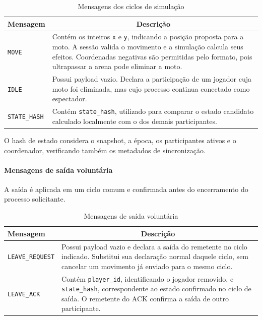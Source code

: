 \documentclass[11pt,a4paper]{article}
\begin{document}
\begin{table}[H]
    \centering
    \caption{Mensagens dos ciclos de simulação}
    \label{tab:simulacao_p2p}
    \begin{tabular}{|p{3.5cm}|p{10cm}|}
        \hline
        \textbf{Mensagem} &
        \multicolumn{1}{c|}{\textbf{Descrição}} \\ \hline

        \texttt{MOVE} &
        Contém os inteiros \texttt{x} e \texttt{y}, indicando a posição proposta para a moto. A sessão valida o movimento e a simulação calcula seus efeitos. Coordenadas negativas são permitidas pelo formato, pois ultrapassar a arena pode eliminar a moto. \\ \hline

        \texttt{IDLE} &
        Possui payload vazio. Declara a participação de um jogador cuja moto foi eliminada, mas cujo processo continua conectado como espectador. \\ \hline

        \texttt{STATE\_HASH} &
        Contém \texttt{state\_hash}, utilizado para comparar o estado candidato calculado localmente com o dos demais participantes. \\ \hline
    \end{tabular}
\end{table}

O hash de estado considera o snapshot, a época, os participantes ativos e o coordenador, verificando também os metadados de sincronização.

\paragraph{Mensagens de saída voluntária}

A saída é aplicada em um ciclo comum e confirmada antes do encerramento do processo solicitante.

\begin{table}[H]
    \centering
    \caption{Mensagens de saída voluntária}
    \label{tab:saida_p2p}
    \begin{tabular}{|p{3.5cm}|p{10cm}|}
        \hline
        \textbf{Mensagem} &
        \multicolumn{1}{c|}{\textbf{Descrição}} \\ \hline

        \texttt{LEAVE\_REQUEST} &
        Possui payload vazio e declara a saída do remetente no ciclo indicado. Substitui sua declaração normal daquele ciclo, sem cancelar um movimento já enviado para o mesmo ciclo. \\ \hline

        \texttt{LEAVE\_ACK} &
        Contém \texttt{player\_id}, identificando o jogador removido, e \texttt{state\_hash}, correspondente ao estado confirmado no ciclo de saída. O remetente do ACK confirma a saída de outro participante. \\ \hline
    \end{tabular}
\end{table}
\end{document}

